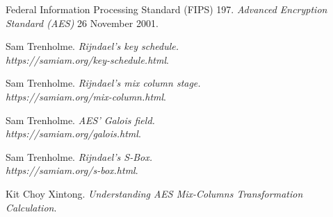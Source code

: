 \documentclass[a4paper, 10pt]{article}
\begin{document}
\begin{multicols}{2}
        \begin{thebibliography}{3}
            Federal Information Processing Standard (FIPS) 197.
            \textit{Advanced Encryption Standard (AES)}
            26 November 2001.

            Sam Trenholme.
            \textit{Rijndael's key schedule.\\https://samiam.org/key-schedule.html}.

            Sam Trenholme.
            \textit{Rijndael's mix column stage.\\https://samiam.org/mix-column.html}.

            Sam Trenholme.
            \textit{AES' Galois field.\\https://samiam.org/galois.html}.

            Sam Trenholme.
            \textit{Rijndael's S-Box.\\https://samiam.org/s-box.html}.

            Kit Choy Xintong.
            \textit{Understanding AES Mix-Columns Transformation Calculation}.
        \end{thebibliography}

    \end{multicols}
\end{document}
